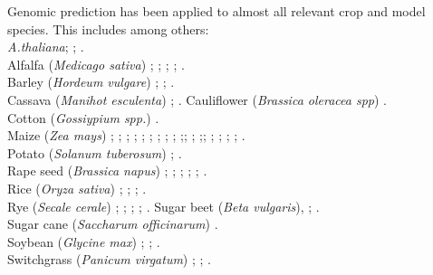 Genomic prediction has been applied to almost all relevant crop and model species. This
includes among others: \\
\textit{A.thaliana}; \cite{shen2013novel}; \cite{hu2015}.\\
Alfalfa (\textit{Medicago sativa}) \cite{li2012applied}; \cite{annicchiarico2015accuracy}; \cite{li2015genomical}; \cite{biazzi2017genome}; \cite{hawkins2018recent}. \\
Barley (\textit{Hordeum vulgare}) \cite{zhong2009factors}; \cite{oakey2016}; \cite{neyhart2019}. \\
Cassava (\textit{Manihot esculenta}) \cite{elias2018}; \cite{elias2018improving}.
Cauliflower (\textit{Brassica oleracea spp}) \cite{thorwarth2018genomic}.\\
Cotton (\textit{Gossiypium spp.}) \cite{gapare2018}.\\
Maize (\textit{Zea mays}) \cite{rincent2012}; \cite{windhausen2012};
\cite{technow2013genomic}; \cite{riedelsheimer2013genomic}; \cite{guo2013accuracy};
\cite{peiffer2014genetic}; \cite{technow2014genome}; \cite{lehermeier2014usefulness};
\cite{owens2014foundation}; \cite{montesinos2015threshold};\cite{bustos2016improvement};
\cite{kadam2016genomic}; \cite{schopp2017accuracy};\cite{schopp2017genomic};
\cite{e2017genomic}; \cite{brauner2018genomic};
\cite{schrag2018beyond}; \cite{moeinizade2019}; \cite{allier2019usefulness}. \\
Potato (\textit{Solanum tuberosum}) \cite{enciso2018genomic}; \cite{Endelman2018pot}.\\
Rape seed (\textit{Brassica napus}) \cite{snowdon2012potential}; \cite{wurschum2014potential}; \cite{qian2014sub}; \cite{jan2016genomic}; \cite{luo2017genomic}; \cite{werner2018effective}.\\
Rice (\textit{Oryza sativa})  \cite{Xu2013rice}; \cite{Grenier2015}; \cite{BenHassen2018}; \cite{Momen2019}. \\
Rye (\textit{Secale cerale}) \cite{bernal2014importance}; \cite{wang2014accuracy};
\cite{auinger2016model}; \cite{marulanda2016optimum}; \cite{bernal2017genomic}.
Sugar beet (\textit{Beta vulgaris}), \cite{wurschum2013genomic}; \cite{biscarini2014genome}.\\
Sugar cane (\textit{Saccharum officinarum}) \cite{gouy2013experimental}.\\
Soybean (\textit{Glycine max}) \cite{Jarquin_2016}; \cite{Xavier_2016}; \cite{Stewart_Brown_2019}.\\
Switchgrass (\textit{Panicum virgatum}) \cite{Ramstein_2016}; \cite{Poudel_2019}; \cite{Ramstein_2019}. \\
